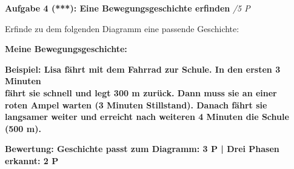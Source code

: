 \documentclass[11pt,a4paper]{article}
\newcommand{\lsg}[1]{\textcolor{loesung}{\textbf{#1}}}
\newcommand{\stern}[1]{\textbf{(#1)}}
\begin{document}
\vspace{1.5em}

\noindent\textbf{Aufgabe 4 \stern{***}: Eine Bewegungsgeschichte erfinden} \hfill \textit{/5 P}

\vspace{0.5em}
\noindent Erfinde zu dem folgenden Diagramm eine passende Geschichte:

\begin{center}
\end{center}

\noindent\textbf{Meine Bewegungsgeschichte:}

\vspace{0.5em}
\noindent\lsg{Beispiel: Lisa fährt mit dem Fahrrad zur Schule. In den ersten 3 Minuten}\\[0.5em]
\noindent\lsg{fährt sie schnell und legt 300 m zurück. Dann muss sie an einer}\\[0.5em]
\noindent\lsg{roten Ampel warten (3 Minuten Stillstand). Danach fährt sie}\\[0.5em]
\noindent\lsg{langsamer weiter und erreicht nach weiteren 4 Minuten die Schule (500 m).}

\vspace{0.5em}
\lsg{Bewertung: Geschichte passt zum Diagramm: 3 P | Drei Phasen erkannt: 2 P}
\end{document}
